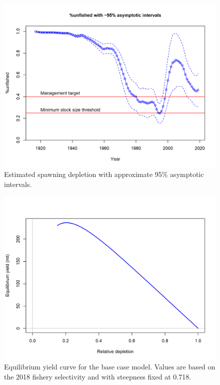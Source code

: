 \documentclass[12pt,]{article}
\begin{document}
\begin{figure}
\centering
\includegraphics{r4ss/plots_mod1/ts9_unfished_with_95_asymptotic_intervals_intervals.png}
\caption{Estimated spawning depletion with approximate 95\% asymptotic
intervals.
\label{fig:ts9_unfished_with_95_asymptotic_intervals_intervals}}
\end{figure}

\begin{figure}
\centering
\includegraphics{r4ss/plots_mod1/yield1_yield_curve.png}
\caption{Equilibrium yield curve for the base case model. Values are
based on the 2018 fishery selectivity and with steepness fixed at 0.718.
\label{fig:yield1_yield_curve}}
\end{figure}
\end{document}

